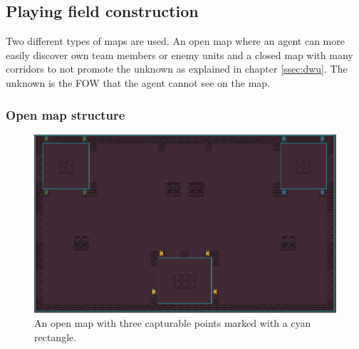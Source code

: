 \documentclass[]{report}
\begin{document}
		\subsection{Playing field construction}
		Two different types of maps are used. An open map where an agent can more easily discover own team members or enemy units and a closed map with many corridors to not promote the unknown as explained in chapter \ref{ssec:dwu}. The unknown is the \ac{FOW} that the agent cannot see on the map. 
		
		\subsubsection{Open map structure}
			\begin{figure}[h!]
			\centering
			\includegraphics[width=1\linewidth]{"Images/open map"}
			\caption[Open map structure]{An open map with three capturable points marked with a cyan rectangle.}
			\label{fig:open-map}
			\end{figure}
		
		\clearpage
\end{document}
